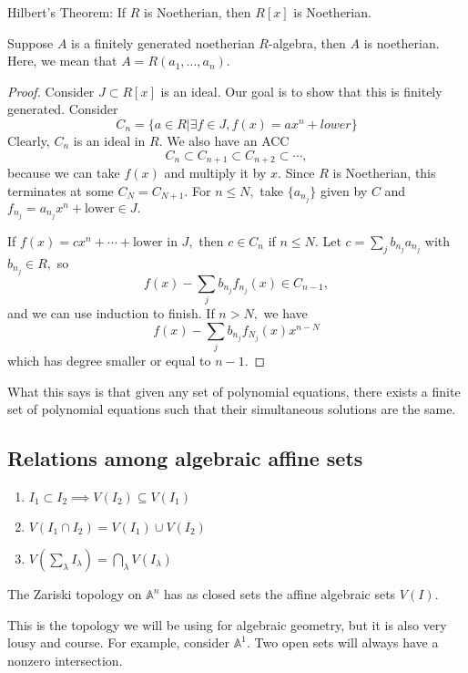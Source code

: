 \documentclass{article}
\numberwithin{equation}{section}
\begin{document}
\begin{theorem}
    Hilbert's Theorem: If $R$ is Noetherian, then $R[x]$ is Noetherian.
\end{theorem}
\begin{corollary}
    Suppose $A$ is a finitely generated noetherian $R$-algebra, then $A$ is noetherian. Here, we mean that $A=R(a_1,\dots,a_n).$
\end{corollary}
\begin{proof}
    Consider $J\subset R[x]$ is an ideal. Our goal is to show that this is finitely generated. Consider 
    \begin{equation}
        C_n = \{a\in R |\exists f\in J,f(x)=ax^n+lower\}
    \end{equation}
    Clearly, $C_n$ is an ideal in $R.$ We also have an ACC 
    \begin{equation*}
        C_n \subset C_{n+1} \subset C_{n+2} \subset \cdots,
    \end{equation*}
    because we can take $f(x)$ and multiply it by $x.$ Since $R$ is Noetherian, this terminates at some $C_N=C_{N+1}$. For $n\le N,$ take $\{a_{n_j}\}$ given by $C$ and $f_{n_j}=a_{n_j}x^n+\text{lower}\in J.$

    If $f(x)=cx^n + \cdots + \text{lower}$ in $J,$ then $c\in C_n$ if $n \le N.$ Let $c=\sum_j b_{n_j}a_{n_j}$ with $b_{n_j}\in R,$ so 
    \begin{equation*}
        f(x)-\sum_j b_{n_j}f_{n_j}(x) \in C_{n-1},
    \end{equation*}
    and we can use induction to finish. If $n>N,$ we have 
    \begin{equation}
        f(x) - \sum_j b_{n_j}f_{N_j}(x) x^{n-N}
    \end{equation}
    which has degree smaller or equal to $n-1.$
\end{proof}
What this says is that given any set of polynomial equations, there exists a finite set of polynomial equations such that their simultaneous solutions are the same.
\subsection{Relations among algebraic affine sets}
\begin{enumerate}[label=(\alph*)]
    \item $I_1 \subset I_2 \implies V(I_2) \subseteq V(I_1)$
    \item $V(I_1 \cap I_2) = V(I_1) \cup V(I_2)$
    \item $V\left(\sum_{\lambda}I_{\lambda}\right) = \bigcap_{\lambda} V(I_{\lambda})$
\end{enumerate}
\begin{definition}
    The Zariski topology on $\mathbb{A}^n$ has as closed sets the affine algebraic sets $V(I).$
\end{definition}
This is the topology we will be using for algebraic geometry, but it is also very lousy and course. For example, consider $\mathbb{A}^1.$ Two open sets will always have a nonzero intersection.
\end{document}
